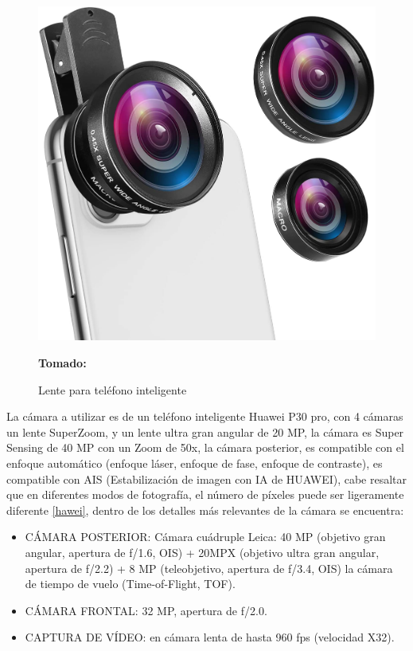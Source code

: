 \documentclass[12pt,twocolumn,a4paper]{article}
\begin{document}
\begin{figure}[h]
	\centering
	\includegraphics[scale=0.1]{lente.jpg}
	\caption{Lente para teléfono inteligente} \textbf{Tomado:} \cite{lente}
	\label{lente}
\end{figure}

La cámara a utilizar es de un teléfono inteligente Huawei P30 pro, con 4 cámaras un lente SuperZoom, y un  lente ultra gran angular de 20 MP, la cámara es Super Sensing de 40 MP con un Zoom de 50x, la cámara posterior, es compatible con el enfoque automático (enfoque láser, enfoque de fase, enfoque de contraste), es compatible con AIS (Estabilización de imagen con IA de HUAWEI), cabe resaltar que en diferentes modos de fotografía, el número de píxeles puede ser ligeramente diferente \ref{hawei}, dentro de los detalles más relevantes de la cámara se encuentra:

\begin{itemize}
\item CÁMARA POSTERIOR: Cámara cuádruple Leica: 40 MP (objetivo gran angular, apertura de f/1.6, OIS) + 20MPX (objetivo ultra gran angular, apertura de f/2.2) + 8 MP (teleobjetivo, apertura de f/3.4, OIS) la cámara de tiempo de vuelo (Time-of-Flight, TOF).
\item CÁMARA FRONTAL: 32 MP, apertura de f/2.0.
\item CAPTURA DE VÍDEO: en cámara lenta de hasta 960 fps (velocidad X32).
\end{itemize}
\end{document}
